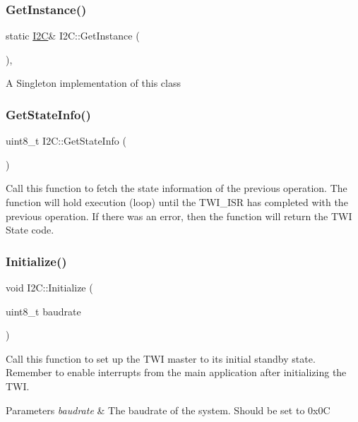 \subsubsection{\texorpdfstring{Get\+Instance()}{GetInstance()}}
{\footnotesize\ttfamily static \hyperlink{class_i2_c}{I2C}\& I2\+C\+::\+Get\+Instance (\begin{DoxyParamCaption}{ }\end{DoxyParamCaption})\hspace{0.3cm}{\ttfamily [inline]}, {\ttfamily [static]}}

A Singleton implementation of this class \hypertarget{class_i2_c_ac46dd0197fdfbea2ff6d24b45f2ec67b}{}\label{class_i2_c_ac46dd0197fdfbea2ff6d24b45f2ec67b} 
\subsubsection{\texorpdfstring{Get\+State\+Info()}{GetStateInfo()}}
{\footnotesize\ttfamily uint8\+\_\+t I2\+C\+::\+Get\+State\+Info (\begin{DoxyParamCaption}{ }\end{DoxyParamCaption})}

Call this function to fetch the state information of the previous operation. The function will hold execution (loop) until the T\+W\+I\+\_\+\+I\+SR has completed with the previous operation. If there was an error, then the function will return the T\+WI State code. \hypertarget{class_i2_c_acfdd142a63b224f178f3edda5f30f2aa}{}\label{class_i2_c_acfdd142a63b224f178f3edda5f30f2aa} 
\subsubsection{\texorpdfstring{Initialize()}{Initialize()}}
{\footnotesize\ttfamily void I2\+C\+::\+Initialize (\begin{DoxyParamCaption}\item[{uint8\+\_\+t}]{baudrate }\end{DoxyParamCaption})}

Call this function to set up the T\+WI master to its initial standby state. Remember to enable interrupts from the main application after initializing the T\+WI. 
\begin{DoxyParams}{Parameters}
{\em baudrate} & The baudrate of the system. Should be set to 0x0C \\
\hline
\end{DoxyParams}
\hypertarget{class_i2_c_a6b0a26e4ebcae7eee8920a70b77fd5c2}{}\label{class_i2_c_a6b0a26e4ebcae7eee8920a70b77fd5c2} 
